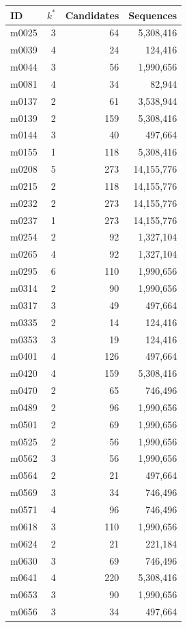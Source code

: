 \documentclass[10pt,a4paper]{article}
\begin{document}
\begin{table}[h!]\centering\small\renewcommand{\arraystretch}{0.91}
\begin{tabular}{lrrr}\toprule ID & $k^*$ & Candidates & Sequences\\\midrule
m0025 & 3 & 64 & 5,308,416\\
m0039 & 4 & 24 & 124,416\\
m0044 & 3 & 56 & 1,990,656\\
m0081 & 4 & 34 & 82,944\\
m0137 & 2 & 61 & 3,538,944\\
m0139 & 2 & 159 & 5,308,416\\
m0144 & 3 & 40 & 497,664\\
m0155 & 1 & 118 & 5,308,416\\
m0208 & 5 & 273 & 14,155,776\\
m0215 & 2 & 118 & 14,155,776\\
m0232 & 2 & 273 & 14,155,776\\
m0237 & 1 & 273 & 14,155,776\\
m0254 & 2 & 92 & 1,327,104\\
m0265 & 4 & 92 & 1,327,104\\
m0295 & 6 & 110 & 1,990,656\\
m0314 & 2 & 90 & 1,990,656\\
m0317 & 3 & 49 & 497,664\\
m0335 & 2 & 14 & 124,416\\
m0353 & 3 & 19 & 124,416\\
m0401 & 4 & 126 & 497,664\\
m0420 & 4 & 159 & 5,308,416\\
m0470 & 2 & 65 & 746,496\\
m0489 & 2 & 96 & 1,990,656\\
m0501 & 2 & 69 & 1,990,656\\
m0525 & 2 & 56 & 1,990,656\\
m0562 & 3 & 56 & 1,990,656\\
m0564 & 2 & 21 & 497,664\\
m0569 & 3 & 34 & 746,496\\
m0571 & 4 & 96 & 746,496\\
m0618 & 3 & 110 & 1,990,656\\
m0624 & 2 & 21 & 221,184\\
m0630 & 3 & 69 & 746,496\\
m0641 & 4 & 220 & 5,308,416\\
m0653 & 3 & 90 & 1,990,656\\
m0656 & 3 & 34 & 497,664\\

\end{tabular}
\end{table}
\end{document}
